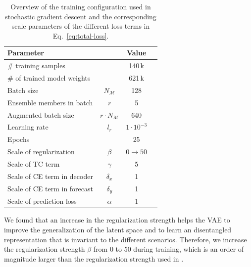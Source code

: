\documentclass[english,a4paper,10pt]{scrartcl}
\begin{document}
\begin{table}
    \caption{\label{tab:model-training}Overview of the training configuration used in stochastic gradient descent and the corresponding scale parameters of the different loss terms in Eq.~\eqref{eq:total-loss}.}
    \centering{}
    \begin{tabular}{lccc}
        \toprule
        Parameter                    &                          & Value             \\
        \midrule
        \# training samples          &                          & 140\,k            \\
        \# of trained model weights  &                          & 621\,k            \\
        Batch size                   & $N_{\mathcal{M}}$        & 128               \\
        Ensemble members in batch    & $r$                      & 5                 \\
        Augmented batch size         & $r\cdot N_{\mathcal{M}}$ & 640               \\
        Learning rate                & $l_r$                    & $1 \cdot 10^{-3}$ \\
        Epochs                       &                          & 25                \\
        \midrule
        Scale of regularization      & $\beta$                  & $0\rightarrow50$  \\
        Scale of TC term             & $\gamma$                 & 5                 \\
        Scale of CE term in decoder  & $\delta_{x}$             & 1                 \\
        Scale of CE term in forecast & $\delta_{y}$             & 1                 \\
        Scale of prediction loss     & $\alpha$                 & 1                 \\
        \bottomrule
    \end{tabular}
\end{table}

We found that an increase in the regularization strength helps the VAE to improve the generalization of the latent space and to learn an disentangled representation that is invariant to the different scenarios. Therefore, we increase the regularization strength $\beta$ from 0 to 50 during training, which is an order of magnitude larger than the regularization strength used in \cite{Groth.precip-predict.2023}.
\end{document}
